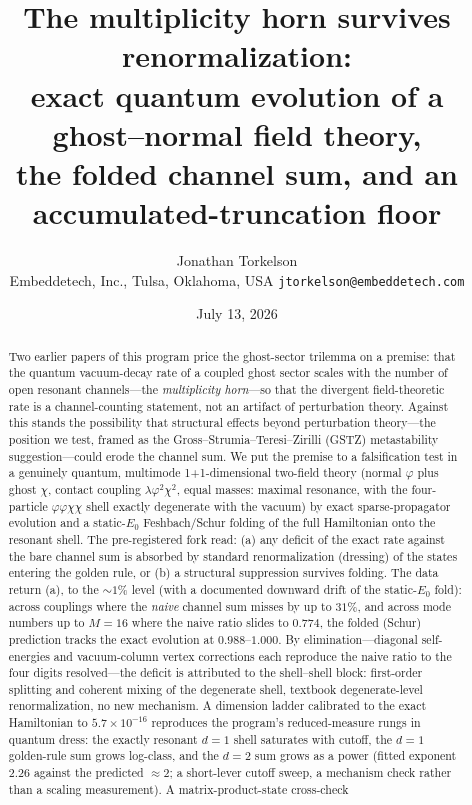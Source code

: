\documentclass[11pt]{article}
\title{The multiplicity horn survives renormalization:\\
exact quantum evolution of a ghost--normal field theory,\\
the folded channel sum, and an accumulated-truncation floor}
\author{Jonathan Torkelson\\[2pt]
\small Embeddetech, Inc., Tulsa, Oklahoma, USA \quad
\texttt{jtorkelson@embeddetech.com}}
\date{July 13, 2026}
\begin{document}
\maketitle

\begin{abstract}
\noindent Two earlier papers of this program price the
ghost-sector trilemma on a premise: that the quantum vacuum-decay
rate of a coupled ghost sector scales with the number of open
resonant channels---the \emph{multiplicity horn}---so that the
divergent field-theoretic rate is a channel-counting statement,
not an artifact of perturbation theory. Against this stands the
possibility that structural effects beyond perturbation
theory---the position we test, framed as the
Gross--Strumia--Teresi--Zirilli (GSTZ) metastability
suggestion---could erode the channel sum. We put the premise
to a falsification test in a genuinely quantum, multimode
1+1-dimensional two-field theory (normal $\varphi$ plus ghost
$\chi$, contact coupling $\lambda\varphi^2\chi^2$, equal masses:
maximal resonance, with the four-particle
$\varphi\varphi\chi\chi$ shell exactly degenerate with the
vacuum) by exact sparse-propagator evolution and a static-$E_0$ Feshbach/Schur
folding of the full Hamiltonian onto the resonant shell. The
pre-registered fork read: (a) any deficit of the exact rate
against the bare channel sum is absorbed by standard
renormalization (dressing) of the states entering the golden rule, or (b) a structural
suppression survives folding. The data return (a), to the ${\sim}1\%$
level (with a documented downward drift of the static-$E_0$ fold):
across couplings where the \emph{naive} channel sum misses by
up to $31\%$, and across mode numbers up to $M=16$ where the
naive ratio slides to $0.774$, the folded (Schur) prediction
tracks the exact evolution at $0.988$--$1.000$. By
elimination---diagonal self-energies and vacuum-column vertex
corrections each reproduce the naive ratio to the four digits resolved---the
deficit is attributed to the shell--shell block: first-order splitting
and coherent mixing of the degenerate shell, textbook degenerate-level
renormalization, no new
mechanism. A dimension ladder calibrated to the exact Hamiltonian
to $5.7\times10^{-16}$ reproduces the program's reduced-measure
rungs in quantum dress: the exactly resonant $d=1$ shell
saturates with cutoff, the $d=1$ golden-rule sum grows log-class, and the
$d=2$ sum grows as a power (fitted exponent $2.26$ against the
predicted $\approx2$; a short-lever cutoff sweep, a mechanism check rather than a
scaling measurement). A matrix-product-state cross-check

\end{abstract}
\end{document}

